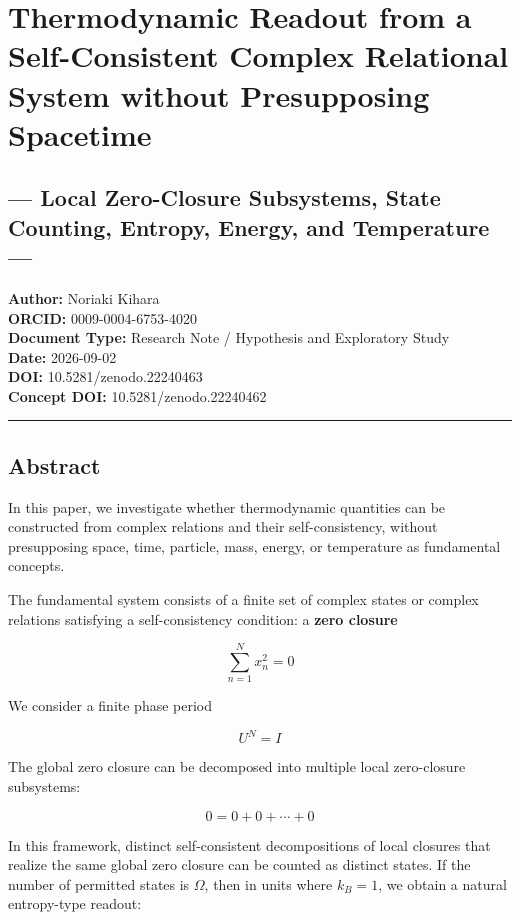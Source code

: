 \documentclass[
  a4paper,
]{article}
\author{}
\date{}
\begin{document}
\section{Thermodynamic Readout from a Self-Consistent Complex Relational
System without Presupposing
Spacetime}\label{thermodynamic-readout-from-a-self-consistent-complex-relational-system-without-presupposing-spacetime}

\subsection{--- Local Zero-Closure Subsystems, State Counting, Entropy,
Energy, and Temperature
---}\label{local-zero-closure-subsystems-state-counting-entropy-energy-and-temperature}

\textbf{Author:} Noriaki Kihara\\
\textbf{ORCID:} 0009-0004-6753-4020\\
\textbf{Document Type:} Research Note / Hypothesis and Exploratory
Study\\
\textbf{Date:} 2026-09-02\\
\textbf{DOI:} 10.5281/zenodo.22240463\\
\textbf{Concept DOI:} 10.5281/zenodo.22240462

\begin{center}\rule{0.5\linewidth}{0.5pt}\end{center}

\subsection{Abstract}\label{abstract}

In this paper, we investigate whether thermodynamic quantities can be
constructed from complex relations and their self-consistency, without
presupposing space, time, particle, mass, energy, or temperature as
fundamental concepts.

The fundamental system consists of a finite set of complex states or
complex relations satisfying a self-consistency condition: a
\textbf{zero closure}

\[
\sum_{n=1}^{N} x_n^2 = 0
\]

We consider a finite phase period

\[
U^N=I
\]

The global zero closure can be decomposed into multiple local
zero-closure subsystems:

\[
0=0+0+\cdots+0
\]

In this framework, distinct self-consistent decompositions of local
closures that realize the same global zero closure can be counted as
distinct states. If the number of permitted states is \(\Omega\), then
in units where \(k_B=1\), we obtain a natural entropy-type readout:
\end{document}
